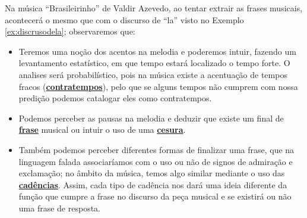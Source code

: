 \begin{example}
Na música ``Brasileirinho''  de Valdir Azevedo, 
ao tentar extrair as frases musicais, 
acontecerá o mesmo que com o discurso de ``la'' visto no Exemplo \ref{ex:discrusodela};
observaremos que:
\begin{itemize}
\item Teremos uma noção dos acentos na melodia e poderemos intuir, 
fazendo um levantamento estatístico,
em que tempo estará localizado o tempo forte. O analises será probabilístico,
pois na música existe a acentuação de tempos fracos (\hyperref[sec:contratempo]{\textbf{contratempos}}), 
pelo que se alguns tempos não cumprem com nossa predição podemos catalogar eles como contratempos.
\item Podemos perceber as pausas na melodia e deduzir que existe um final de \hyperref[sec:Frase]{\textbf{frase}} musical ou intuir o uso de uma \hyperref[fig:Cesura]{\textbf{cesura}}.
\item Também podemos perceber diferentes formas de finalizar uma frase, 
que na linguagem falada associaríamos com o uso ou não de signos de admiração e exclamação;
no âmbito da música, temos algo similar mediante o uso das \hyperref[sec:Cadencia]{\textbf{cadências}}.
Assim, cada tipo de cadência nos dará uma ideia diferente da função que cumpre a frase no discurso da peça musical 
e se existirá ou não uma frase de resposta.
\end{itemize}
\end{example}
